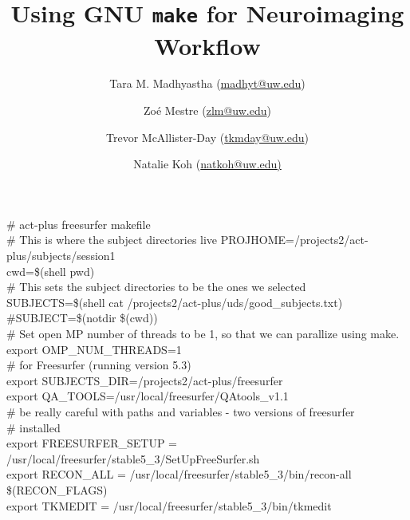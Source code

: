 \documentclass[oneside,11pt]{memoir}
\title{Using GNU \texttt{make} for Neuroimaging Workflow}
\author{ Tara M. Madhyastha (\url{madhyt@uw.edu}) \and Zo\'e Mestre (\url{zlm@uw.edu}) %
	\and Trevor McAllister-Day (\url{tkmday@uw.edu}) \and Natalie Koh (\url{natkoh@uw.edu)} %
}
\newenvironment{make}[2] %
{ \begin{figure}[h!] \def\captiontext{#1} \def\labelt{#2} \begin{tcolorbox}[colback=white,boxrule=0.5pt,arc=4pt,left=6pt,right=6pt,boxsep=0pt,width=\textwidth] \ttfamily }%
		{ \normalfont \end{tcolorbox} \caption{\captiontext} \label{\labelt} \end{figure} }
\begin{document}

\small\ttfamily

	\# act-plus freesurfer makefile \\
	
	\# This is where the subject directories live 
	PROJHOME=/projects2/act-plus/subjects/session1 \\
	
	cwd=\$(shell pwd) \\
	
	\# This sets the subject directories to be the ones we selected \\
	SUBJECTS=\$(shell cat /projects2/act-plus/uds/good_subjects.txt) \\
	\#SUBJECT=\$(notdir \$(cwd)) \\
	
	\# Set open MP number of threads to be 1, so that we can parallize using make. \\
	export OMP_NUM_THREADS=1 \\
	
	\# for Freesurfer (running version 5.3) \\
	export SUBJECTS_DIR=/projects2/act-plus/freesurfer \\
	export QA_TOOLS=/usr/local/freesurfer/QAtools_v1.1 \\
	
	\# be really careful with paths and variables - two versions of freesurfer \\
	\# installed \\
	export FREESURFER_SETUP = /usr/local/freesurfer/stable5_3/SetUpFreeSurfer.sh \\
	export RECON_ALL = /usr/local/freesurfer/stable5_3/bin/recon-all \$(RECON_FLAGS) \\
	export TKMEDIT = /usr/local/freesurfer/stable5_3/bin/tkmedit \\
	
\end{document}

